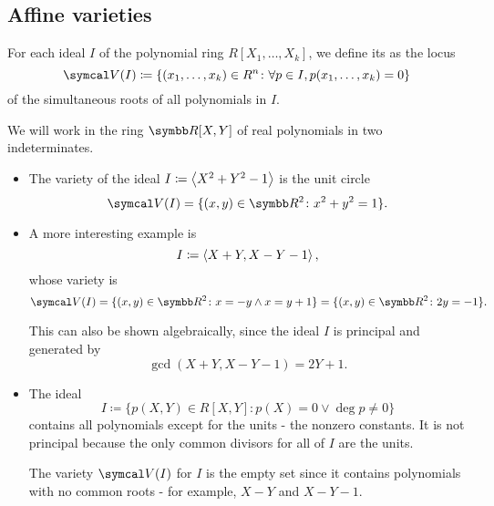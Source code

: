 \subsection{Affine varieties}\label{subsec:affine_varieties}

\begin{definition}\label{def:affine_variety}\cite[69]{Коцев2016}
  For each ideal \( I \) of the polynomial ring \( R[X_1, \ldots, X_k] \), we define its  as the locus
  \begin{equation*}
    \Cal{V}(I) \coloneqq \{ (x_1, \ldots, x_k) \in R^n \colon \forall p \in I, p(x_1, \ldots, x_k) = 0 \}
  \end{equation*}
  of the simultaneous roots of all polynomials in \( I \).
\end{definition}

\begin{example}\label{ex:affine_varieties}
  We will work in the ring \( \R[X, Y] \) of real polynomials in two indeterminates.

  \begin{itemize}
    \item The variety of the ideal \( I \coloneqq \left\langle X^2 + Y^2 - 1 \right\rangle \) is the unit circle
    \begin{equation*}
      \Cal{V}(I) = \{ (x, y) \in \R^2 \colon x^2 + y^2 = 1 \}.
    \end{equation*}

    \item A more interesting example is
    \begin{equation*}
      I \coloneqq \left\langle X + Y, X - Y - 1 \right\rangle,
    \end{equation*}
    whose variety is
    \begin{equation*}
      \Cal{V}(I) = \{ (x, y) \in \R^2 \colon x = -y \land x = y + 1 \} = \{ (x, y) \in \R^2 \colon 2y = -1 \}.
    \end{equation*}

    This can also be shown algebraically, since the ideal \( I \) is principal and generated by
    \begin{equation*}
      \gcd(X + Y, X - Y - 1) = 2Y + 1.
    \end{equation*}

    \item The ideal
    \begin{equation*}
      I \coloneqq \{ p(X, Y) \in R[X, Y] \colon p(X) = 0 \lor \deg p \neq 0 \}
    \end{equation*}
    contains all polynomials except for the units - the nonzero constants. It is not principal because the only common divisors for all of \( I \) are the units.

    The variety \( \Cal{V}(I) \) for \( I \) is the empty set since it contains polynomials with no common roots - for example, \( X - Y \) and \( X - Y - 1 \).
  \end{itemize}
\end{example}

